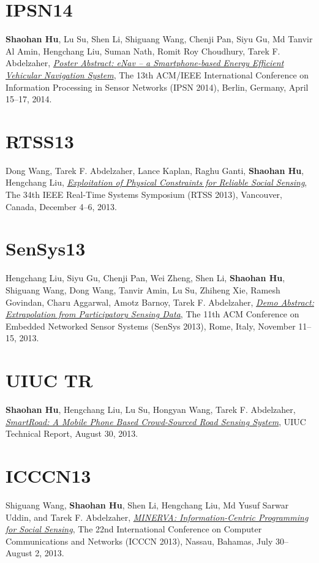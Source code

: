 \section{\sc IPSN14}\hypertarget{hu2014ipsn}{}
\textbf{Shaohan Hu}, Lu Su, Shen Li, Shiguang Wang, Chenji Pan, Siyu Gu, Md Tanvir Al Amin, Hengchang Liu, Suman Nath, Romit Roy Choudhury, Tarek F.
Abdelzaher, \href{}{\emph{Poster Abstract: eNav -- a Smartphone-based Energy Efficient Vehicular Navigation System}}, \textsf{The 13th
  ACM/IEEE International Conference on Information Processing in
  Sensor Networks (IPSN 2014)}, Berlin, Germany, April 15--17, 2014.

\section{\sc RTSS13}\hypertarget{wang2013rtss}{}
Dong Wang, Tarek F. Abdelzaher, Lance Kaplan, Raghu Ganti,
\textbf{Shaohan Hu}, Hengchang Liu, \href{http://ieeexplore.ieee.org/xpl/articleDetails.jsp?tp=&arnumber=6728876}{\emph{Exploitation of Physical
  Constraints for Reliable Social Sensing}}, \textsf{The 34th IEEE
  Real-Time Systems Symposium (RTSS 2013)}, Vancouver, Canada,
December 4--6, 2013.

\section{\sc SenSys13}\hypertarget{liu2013sensys}{}
Hengchang Liu, Siyu Gu, Chenji Pan, Wei Zheng, Shen Li,
\textbf{Shaohan Hu}, Shiguang Wang, Dong Wang, Tanvir Amin, Lu Su,
Zhiheng Xie, Ramesh Govindan, Charu Aggarwal, Amotz Barnoy, Tarek F.
Abdelzaher, \href{http://portal.acm.org/citation.cfm?id=2517431}{\emph{Demo Abstract: Extrapolation from Participatory
  Sensing Data}}, \textsf{The 11th ACM Conference on Embedded Networked
  Sensor Systems (SenSys 2013)}, Rome, Italy, November 11--15, 2013.

\section{\sc UIUC TR}\hypertarget{hu2013uiuc2}{}
\textbf{Shaohan Hu}, Hengchang Liu, Lu Su, Hongyan Wang, Tarek F.
Abdelzaher, \href{https://www.ideals.illinois.edu/handle/2142/45699}{\emph{SmartRoad: A Mobile Phone Based Crowd-Sourced Road
  Sensing System}}, \textsf{UIUC Technical Report}, August 30, 2013.

\section{\sc ICCCN13}\hypertarget{wang2013icccn}{}
Shiguang Wang, \textbf{Shaohan Hu}, Shen Li, Hengchang Liu, Md Yusuf
Sarwar Uddin, and Tarek F. Abdelzaher, \href{http://ieeexplore.ieee.org/xpls/abs_all.jsp?arnumber=6614152}{\emph{MINERVA: Information-Centric
  Programming for Social Sensing}}, \textsf{The 22nd International
  Conference on Computer Communications and Networks (ICCCN 2013)},
Nassau, Bahamas, July 30--August 2, 2013.

